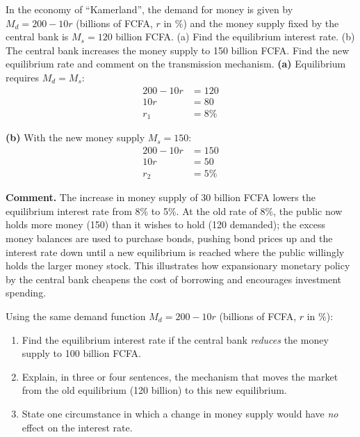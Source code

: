 \documentclass[11pt]{article}
\begin{document}
\begin{exoresolu}
In the economy of ``Kamerland'', the demand for money is given by $M_d = 200 - 10r$ (billions of FCFA, $r$ in \%) and the money supply fixed by the central bank is $M_s = 120$ billion FCFA. (a) Find the equilibrium interest rate. (b) The central bank increases the money supply to 150 billion FCFA. Find the new equilibrium rate and comment on the transmission mechanism.
\tcblower
\textbf{(a)} Equilibrium requires $M_d = M_s$:
\begin{align*}
200 - 10r &= 120\\
10r &= 80\\
r_1 &= 8\%
\end{align*}

\textbf{(b)} With the new money supply $M_s = 150$:
\begin{align*}
200 - 10r &= 150\\
10r &= 50\\
r_2 &= 5\%
\end{align*}

\textbf{Comment.} The increase in money supply of 30 billion FCFA lowers the equilibrium interest rate from 8\% to 5\%. At the old rate of 8\%, the public now holds more money (150) than it wishes to hold (120 demanded); the excess money balances are used to purchase bonds, pushing bond prices up and the interest rate down until a new equilibrium is reached where the public willingly holds the larger money stock. This illustrates how expansionary monetary policy by the central bank cheapens the cost of borrowing and encourages investment spending.
\end{exoresolu}

\begin{exercice}[Practice]
Using the same demand function $M_d = 200 - 10r$ (billions of FCFA, $r$ in \%):
\begin{enumerate}
\item Find the equilibrium interest rate if the central bank \emph{reduces} the money supply to 100 billion FCFA.
\item Explain, in three or four sentences, the mechanism that moves the market from the old equilibrium (120 billion) to this new equilibrium.
\item State one circumstance in which a change in money supply would have \emph{no} effect on the interest rate.
\end{enumerate}
\end{exercice}
\end{document}
